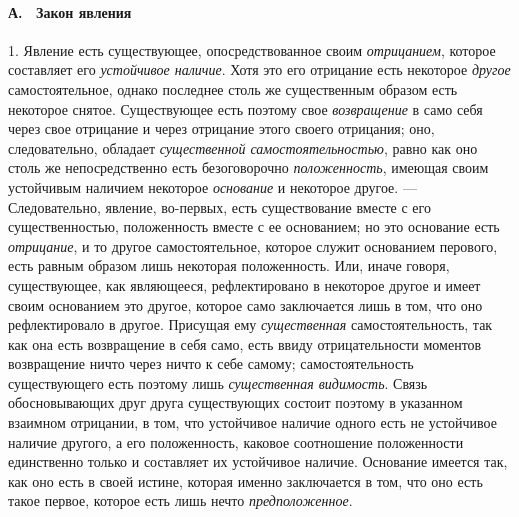\paragraph[А. \ Закон явления]{А. \ Закон явления}
\hypertarget{Toc478978746}{}1. Явление есть существующее, опосредствованное
своим {\em отрицанием}, которое составляет его
{\em устойчивое наличие}. Хотя это его отрицание есть
некоторое {\em другое} самостоятельное, однако
последнее столь же существенным образом есть некоторое снятое. Существующее
есть поэтому свое {\em возвращение} в само себя через
свое отрицание и через отрицание этого своего отрицания; оно,
следовательно, обладает {\em существенной
самостоятельностью}, равно как оно столь же непосредственно есть
безоговорочно {\em положенность}, имеющая своим
устойчивым наличием некоторое {\em основание} и
некоторое другое. — Следовательно, явление, во-первых, есть существование
вместе с его существенностью, положенность вместе с ее основанием; но это
основание есть {\em отрицание}, и то другое
самостоятельное, которое служит основанием перового, есть равным образом
лишь некоторая положенность. Или, иначе говоря, существующее, как
являющееся, рефлектировано в некоторое другое и имеет своим основанием это
другое, которое само заключается лишь в том, что оно рефлектировало в
другое. Присущая ему {\em существенная}
самостоятельность, так как она есть возвращение в себя само, есть ввиду
отрицательности моментов возвращение ничто через ничто к себе самому;
самостоятельность существующего есть поэтому лишь
{\em существенная видимость}. Связь обосновывающих друг
друга существующих состоит поэтому в указанном взаимном отрицании, в том,
что устойчивое наличие одного есть не устойчивое наличие другого, а его
положенность, каковое соотношение положенности единственно только и
составляет их устойчивое наличие. Основание имеется так, как оно есть в
своей истине, которая именно заключается в том, что оно есть такое первое,
которое есть лишь нечто {\em предположенное}.

